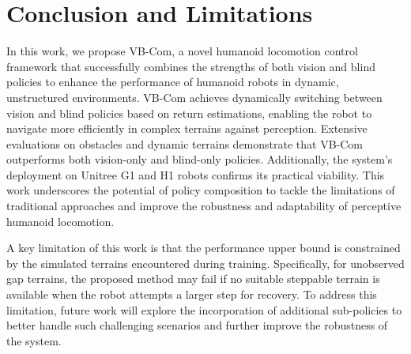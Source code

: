 \section{Conclusion and Limitations} \label{sec:conclusion}

In this work, we propose VB-Com, a novel humanoid locomotion control framework that successfully combines the strengths of both vision and blind policies to enhance the performance of humanoid robots in dynamic, unstructured environments.  VB-Com achieves dynamically switching between vision and blind policies based on return estimations, enabling the robot to navigate more efficiently in complex terrains against perception. Extensive evaluations on obstacles and dynamic terrains demonstrate that VB-Com outperforms both vision-only and blind-only policies. Additionally, the system's deployment on Unitree G1 and H1 robots confirms its practical viability. This work underscores the potential of policy composition to tackle the limitations of traditional approaches and improve the robustness and adaptability of perceptive humanoid locomotion.

A key limitation of this work is that the performance upper bound is constrained by the simulated terrains encountered during training. Specifically, for unobserved gap terrains, the proposed method may fail if no suitable steppable terrain is available when the robot attempts a larger step for recovery. To address this limitation, future work will explore the incorporation of additional sub-policies to better handle such challenging scenarios and further improve the robustness of the system.